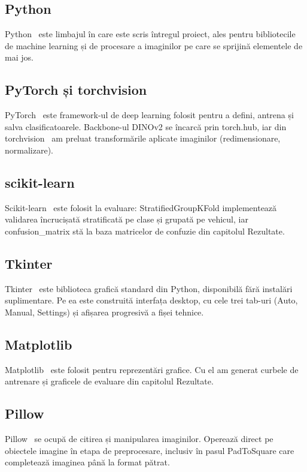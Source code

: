 \documentclass[12pt, a4paper, openany]{book}
\begin{document}
\subsection{Python}
Python~\cite{vanrossum2009python} este limbajul în care este scris întregul proiect, ales pentru bibliotecile de machine learning și de procesare a imaginilor pe care se sprijină elementele de mai jos.


\subsection{PyTorch și torchvision}
PyTorch~\cite{paszke2019pytorch} este framework-ul de deep learning folosit pentru a defini, antrena și salva clasificatoarele. Backbone-ul DINOv2 se încarcă prin torch.hub, iar din torchvision~\cite{marcel2010torchvision} am preluat transformările aplicate imaginilor (redimensionare, normalizare).

\subsection{scikit-learn}
Scikit-learn~\cite{pedregosa2011sklearn} este folosit la evaluare: StratifiedGroupKFold implementează validarea încrucișată stratificată pe clase și grupată pe vehicul, iar confusion\_matrix stă la baza matricelor de confuzie din capitolul Rezultate.

\subsection{Tkinter}
Tkinter~\cite{python2024tkinter} este biblioteca grafică standard din Python, disponibilă fără instalări suplimentare. Pe ea este construită interfața desktop, cu cele trei tab-uri (Auto, Manual, Settings) și afișarea progresivă a fișei tehnice.

\subsection{Matplotlib}
Matplotlib~\cite{hunter2007matplotlib} este folosit pentru reprezentări grafice. Cu el am generat curbele de antrenare și graficele de evaluare din capitolul Rezultate.

\subsection{Pillow}
Pillow~\cite{clark2015pillow} se ocupă de citirea și manipularea imaginilor. Operează direct pe obiectele imagine în etapa de preprocesare, inclusiv în pasul PadToSquare care completează imaginea până la format pătrat.
\end{document}
